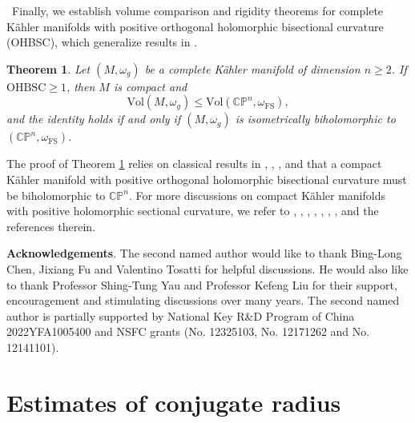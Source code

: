 \documentclass[12pt]{amsart}
\theoremstyle{plain}
\newtheorem{thm}{Theorem}[section]
\theoremstyle{definition}
\newcommand{\btheorem}{\begin{thm}}
\newcommand{\etheorem}{\end{thm}}
\newcommand{\beq}{\begin{equation}}
\newcommand{\eeq}{\end{equation}}
\renewcommand{\>}{\rightarrow}
\newcommand{\C}{{\mathbb C}}
\renewcommand{\P}{{\mathbb P}}
\newcommand{\om}{\omega}
\numberwithin{equation}{section} %
\begin{document}
\	Finally, we  establish volume comparison and rigidity theorems for complete K\"ahler manifolds with positive orthogonal holomorphic bisectional curvature (OHBSC), 
	which generalize  results in \cite{LW05}.
	
	
	\btheorem\label{OHBSC}	Let $(M,\om_g)$ be a complete K\"ahler manifold of dimension $n\ge 2$. If  $\mathrm{OHBSC}\geq 1$, then $M$ is compact and
	\beq 
	\mathrm{Vol}(M,\om_g)\le  \mathrm{Vol}(\C\P^n,\om_{\mathrm{FS}}),
	\label{formula HBSC vol upper}
	\eeq
	and the identity holds if and only if $(M,\om_g)$ is isometrically biholomorphic to $(\C\P^n,\om_{\mathrm{FS}})$.
	\etheorem 
	
	\noindent	The proof of Theorem \ref{OHBSC} relies on classical results in  \cite{Mok88}, \cite{Che07}, \cite{GZ10}, \cite{CT12} and \cite{FLW17} that a compact K\"ahler manifold with positive orthogonal holomorphic bisectional curvature must be biholomorphic to $\C\P^n$.    For more  discussions on compact K\"ahler manifolds with positive holomorphic sectional curvature, we refer to \cite{YZ19}, \cite{Yan20}, \cite{Yang2021}, \cite{Ni21}, \cite{Mat22},  \cite{NZ22}, \cite{LZZ21+}, \cite{ZZ23+} and the references therein.

\baselineskip


\noindent\textbf{Acknowledgements}. The second named author  would like to thank Bing-Long Chen, Jixiang Fu and Valentino Tosatti for
helpful discussions.  He would also like to thank   Professor Shing-Tung Yau and Professor Kefeng Liu for their support, encouragement and stimulating
discussions over many years. The second named author is partially supported by National Key R\&D
Program of China 2022YFA1005400 and NSFC grants (No. 12325103, No. 12171262
and No. 12141101). 

\baselineskip
	
	\section{Estimates of conjugate radius}
	
\end{document}
